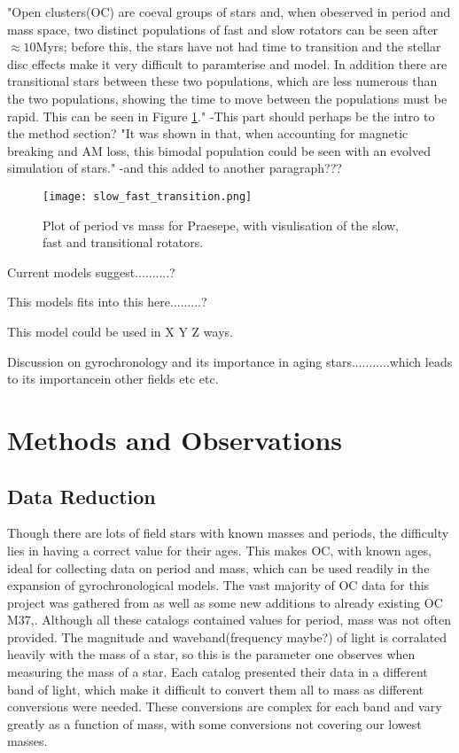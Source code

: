 \documentclass[fleqn,usenatbib]{mnras}
\begin{document}
"Open clusters(OC) are coeval groups of stars and, when obeserved in period and mass space, two distinct populations of fast and slow rotators can be seen after $\approx 10$Myrs; before this, the stars have not had time to transition and the  stellar disc effects make it very difficult to paramterise and model.
In addition there are  transitional stars between these two populations, which are less numerous than the two populations, showing the time to move between the populations must be rapid.
This can be seen in Figure \ref{fig:slow_fast_transition}."
-This part should perhaps be the intro to the method section?
"It was shown in \cite{Garraffo_2018} that, when accounting for magnetic breaking and AM loss, this bimodal population could be seen with an evolved simulation of stars."
-and this added to another paragraph???

\begin{figure}
	\texttt{[image: slow\_fast\_transition.png]}
	\caption[]{Plot of period vs mass for Praesepe, with visulisation of the slow, fast and transitional rotators.}
	\label{fig:slow_fast_transition}
\end{figure}

Current models suggest..........?

This models fits into this here.........?

This model could be used in X Y Z ways.

Discussion on gyrochronology and its importance in aging stars...........which leads to its importancein other fields etc etc.


\section{Methods and Observations}
\subsection{Data Reduction}
Though there are lots of field stars with known masses and periods, the difficulty lies in having a correct value for their ages.
This makes OC, with known ages, ideal for collecting data on period and mass, which can be used readily in the expansion of gyrochronological models. 
The vast majority of OC data for this project was gathered from \cite{beuther2014protostars} as well as some new additions to already existing OC M37,\cite{chang}.
Although all these catalogs contained values for period, mass was not often provided.
The magnitude and waveband(frequency maybe?) of light is corralated heavily with the mass of a star, so this is the parameter one observes when measuring the mass of a star. 
Each catalog presented their data in a different band of light, which make it difficult to convert them all to mass as different conversions were needed.
These conversions are complex for each band and vary greatly as a function of mass, with some conversions not covering our lowest masses.
\end{document}
